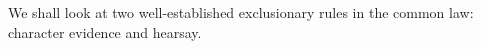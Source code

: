 \documentclass[10pt]{article}
\begin{document}
%
%

We shall look at two well-established 
exclusionary rules in the common law: 
character evidence and hearsay. 

%
%
\end{document}
